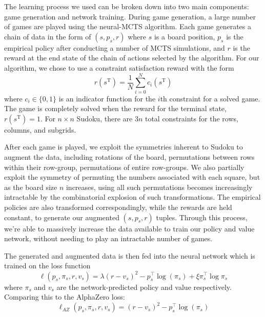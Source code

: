 \documentclass[10pt, reqno, letterpaper, twoside]{amsart}
\begin{document}
The learning process we used can be broken down into two main components: game generation and network training. During game generation, a large number of games are played using the neural-MCTS algorithm. Each game generates a chain of data in the form of $(s, p_s, r)$ where $s$ is a board position, $p_s$ is the empirical policy after conducting a number of MCTS simulations, and $r$ is the reward at the end state of the chain of actions selected by the algorithm. For our algorithm, we chose to use a constraint satisfaction reward with the form
\begin{equation}
    r(s^\mathrm{T}) = \frac{1}{N} \sum_{i=0}^N c_i(s^\mathrm{T})
\end{equation}
where $c_i \in \{0,1\}$ is an indicator function for the $i$th constraint for a solved game. The game is completely solved when the reward for the terminal state, $r(s^\mathrm{T})=1$. For $n \times n$ Sudoku, there are $3n$ total constraints for the rows, columns, and subgrids. 

After each game is played, we exploit the symmetries inherent to Sudoku to augment the data, including rotations of the board, permutations between rows within their row-group, permutations of entire row-groups. We also partially exploit the symmetry of permuting the numbers associated with each square, but as the board size $n$ increases, using all such permutations becomes increasingly intractable by the combinatorial explosion of such transformations. The empirical policies are also transformed correspondingly, while the rewards are held constant, to generate our augmented $(s, p_s, r)$ tuples. Through this process, we're able to massively increase the data available to train our policy and value network, without needing to play an intractable number of games. 

The generated and augmented data is then fed into the neural network which is trained on the loss function
\begin{equation}
    \ell (p_s, \pi_s, r, v_s) = \lambda (r - v_s)^2 - p_s^\top \log(\pi_s) + \xi \pi_s^\top \log \pi_s
\end{equation}
where $\pi_s$ and $v_s$ are the network-predicted policy and value respectively. Comparing this to the AlphaZero loss:
\begin{equation}
    \ell_{AZ} (p_s, \pi_s, r, v_s) = (r - v_s)^2 - p_s^\top \log(\pi_s)
\end{equation}
\end{document}
